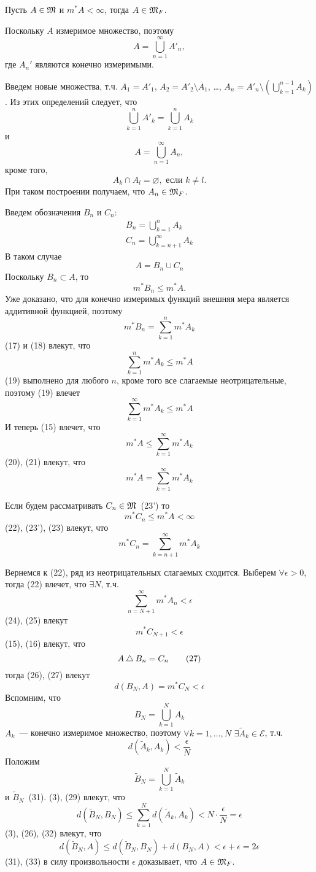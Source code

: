 \documentclass[main]{subfiles}
\begin{document}
\begin{theorem}
    Пусть $A \in \mathfrak{M}$ и $m^*A < \infty$, тогда $A \in \mathfrak{M}_F$.
\end{theorem}
\begin{longProof}
    Поскольку $A$ измеримое множество, поэтому
    \[A = \bigcup_{n=1}^\infty A'_n,\]
    где $A_n'$ являются конечно измеримыми.

    Введем новые множества, т.ч. $A_1 = A'_1$, $A_2 = A'_2 \setminus A_1$, \dots, $A_n = A'_n \setminus \left(\bigcup_{k=1}^{n-1} A_k\right)$.
    Из этих определений следует, что
    \[\bigcup_{k=1}^n A'_k = \bigcup_{k=1}^n A_k\]
    и
    \[A = \bigcup_{n=1}^\infty A_n, \tag{15}\]
    кроме того,
    \[A_k \cap A_l = \varnothing, \text{ если } k \neq l. \tag{16}\]
    При таком построении получаем, что $A_n \in \mathfrak{M}_F$.

    Введем обозначения $B_n$ и $C_n$:
    \begin{gather*}
        B_n = \bigcup_{k=1}^n A_k \\
        C_n = \bigcup_{k=n+1}^\infty A_k
    \end{gather*}
    В таком случае
    \[A = B_n \cup C_n\]
    Поскольку $B_n \subset A$, то
    \[m^* B_n \le m^* A. \tag{17}\]
    Уже доказано, что для конечно измеримых функций внешняя мера является аддитивной функцией, поэтому
    \[m^*B_n = \sum_{k=1}^{n} m^*A_k \tag{18}\]
    (17) и (18) влекут, что
    \[\sum_{k=1}^{n} m^* A_k \le m^* A \tag{19}\]
    (19) выполнено для любого $n$, кроме того все слагаемые неотрицательные, поэтому (19) влечет
    \[\sum_{k=1}^{\infty} m^*A_k \le m^* A \tag{20}\]
    И теперь (15) влечет, что
    \[m^* A \le \sum_{k=1}^{\infty} m^* A_k \tag{21}\]
    (20), (21) влекут, что
    \[m^* A = \sum_{k=1}^{\infty} m^* A_k \tag{22}\]

    Если будем рассматривать $C_n \in \mathfrak{M}$~(23') то
    \[m^* C_n \le m^* A < \infty\tag{23}\]
    (22), (23'), (23) влекут, что
    \[m^* C_n = \sum_{k=n+1}^{\infty} m^* A_k \tag{24}\]

    Вернемся к (22), ряд из неотрицательных слагаемых сходится.
    Выберем $\forall \epsilon >0$, тогда (22) влечет, что $\exists N$, т.ч.
    \[\sum_{n=N+1}^{\infty} m^*A_n < \epsilon \tag{25}\]
    (24), (25) влекут
    \[m^* C_{N+1} < \epsilon \tag{26}\]
    (15), (16) влекут, что
    \[A \mathbin{\triangle} B_n = C_n \tag{27}\]
    тогда (26), (27) влекут
    \[d(B_N, A) = m^* C_N < \epsilon \tag{28}\]
    Вспомним, что
    \[B_N = \bigcup_{k=1}^N A_k\]
    $A_k$~--- конечно измеримое множество, поэтому $\forall k = 1,\dotsc, N$ $\exists \widetilde{A}_k \in \mathcal{E}$, т.ч.
    \[d(\widetilde{A}_k, A_k) < \frac{\epsilon}{N} \tag{29}\]
    Положим
    \[\widetilde{B}_N = \bigcup_{k=1}^N \widetilde{A}_k \tag{30}\]
    и $\widetilde{B}_N$~(31).
    (3), (29) влекут, что
    \[d(\widetilde{B}_N, B_N) \le \sum_{k=1}^{N} d(\widetilde{A}_k, A_k) < N \cdot \frac{\epsilon}{N} = \epsilon \tag{32}\]
    (3), (26), (32) влекут, что
    \[d(\widetilde{B}_N, A) \le d(\widetilde{B}_N, B_N) + d(B_N, A) < \epsilon + \epsilon = 2\epsilon \tag{33}\]
    (31), (33) в силу произвольности $\epsilon$ доказывает, что $A \in \mathfrak{M}_F$.
\end{longProof}
\end{document}
